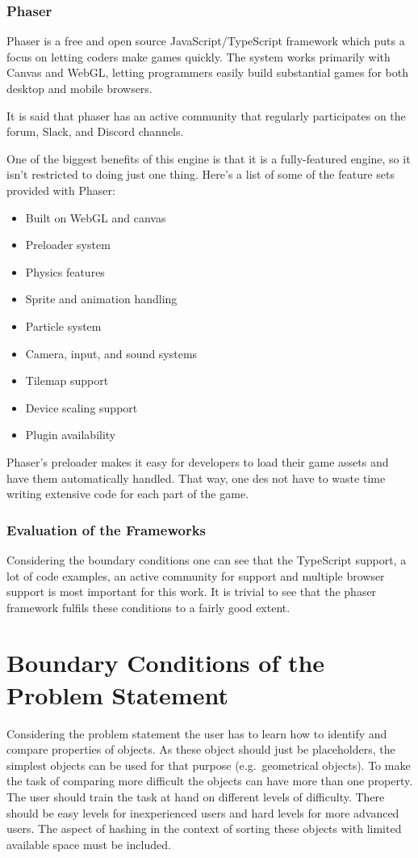 \subsubsection{Phaser}
Phaser is a free and open source JavaScript/TypeScript framework which puts a focus on letting coders make games quickly.
The system works primarily with Canvas and WebGL, letting programmers easily build substantial games for both
desktop and mobile browsers.

It is said that phaser has an active community that regularly participates on the forum, Slack, and Discord channels.

One of the biggest benefits of this engine is that it is a fully-featured engine,
so it isn’t restricted to doing just one thing.
Here’s a list of some of the feature sets provided with Phaser:

\begin{itemize}
    \item Built on WebGL and canvas
    \item Preloader system
    \item Physics features
    \item Sprite and animation handling
    \item Particle system
    \item Camera, input, and sound systems
    \item Tilemap support
    \item Device scaling support
    \item Plugin availability
\end{itemize}

Phaser’s preloader makes it easy for developers to load their game assets and have them automatically handled.
That way, one des not have to waste time writing extensive code for each part of the game\cite{phaserad}.

\subsubsection{Evaluation of the Frameworks}
Considering the boundary conditions one can see that the TypeScript support, a lot of code examples,
an active community for support and multiple browser support is most important for this work.
It is trivial to see that the phaser framework fulfils these conditions to a fairly good extent.

\section{Boundary Conditions of the Problem Statement}\label{sec:boundary-conditions-of-the-problem-statement}
Considering the problem statement the user has to learn how to identify and compare properties of objects.
As these object should just be placeholders, the simplest objects can be used for that purpose (e.g.\ geometrical objects).
To make the task of comparing more difficult the objects can have more than one property.
The user should train the task at hand on different levels of difficulty.
There should be easy levels for inexperienced users and hard levels for more advanced users.
The aspect of hashing in the context of sorting these objects with limited available space must be included.

